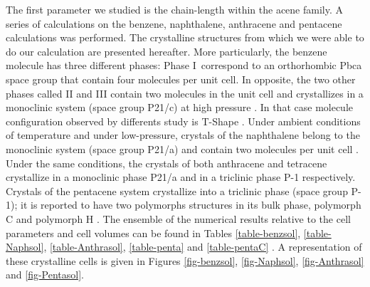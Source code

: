  The first parameter we studied is the chain-length within the acene family. A series of calculations on the benzene, naphthalene, anthracene and pentacene calculations was performed. The crystalline structures from which we were able to do our calculation are presented hereafter. More particularly, the benzene molecule has three different phases: Phase I correspond to an orthorhombic Pbca space group that contain four molecules per unit cell. In opposite, the two other phases called II and III contain two molecules in the unit cell and crystallizes in a monoclinic system (space group P21/c) at high pressure \cite{meijer1996density,katrusiak2010association}. In that case molecule configuration observed by differents study is T-Shape \cite{katrusiak2010association}. Under ambient conditions of temperature and under low-pressure, crystals of the naphthalene belong to the monoclinic system (space group P21/a) and contain two molecules per unit cell \cite{fabbiani2006exploration}. Under the same conditions, the crystals of both anthracene and tetracene crystallize in a monoclinic phase P21/a \cite{brock1990temperature} and in a triclinic phase P-1 \cite{sondermann1985x} respectively. Crystals of the pentacene system crystallize into a triclinic phase (space group P-1); it is reported to have two polymorphs structures in its bulk phase, polymorph C \cite{campbell1962crystal} and polymorph H \cite{mattheus2001polymorphism}. The ensemble of the numerical results relative to the cell parameters and cell volumes can be found in Tables \ref{table-benzsol}, \ref{table-Naphsol}, \ref{table-Anthrasol}, \ref{table-penta} and \ref{table-pentaC} . A representation of these crystalline cells is given in Figures \ref{fig-benzsol}, \ref{fig-Naphsol}, \ref{fig-Anthrasol} and  \ref{fig-Pentasol}.
 
